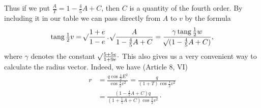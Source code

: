 Thus if we put $\frac{A}{T}=1-\frac{4}{5}A+C$, then $C$ is a quantity of the fourth order. By including it in our table we can pass directly from $A$ to $v$ by the formula
\[
\operatorname{tang}\tfrac{1}{2}v=\mathord{{}^{}\!\surd}\frac{1+e}{1-e}\,\mathord{.}\,\mathord{{}^{}\!\surd}\frac{A}{1-\frac{4}{5}A+C}=\frac{\gamma\operatorname{tang}\tfrac{1}{2}w}{\mathord{{}^{}\!\surd}(1-\frac{4}{5}A+C)},
\]
where $\gamma$ denotes the constant $\mathord{{}^{}\!\surd}\frac{5+5e}{1+9e}\cdot$ This also gives us a very convenient way to calculate the radius vector. Indeed, we have (Article 8, VI)
\[
\begin{aligned}
r&=\frac{q\cos\tfrac{1}{2}E^2}{\cos\tfrac{1}{2}v^2}=\frac{q}{(1+T)\cos\tfrac{1}{2}v^2}\\
&=\frac{(1-\frac{4}{5}A+C)q}{(1+\frac{1}{5}A+C)\cos\tfrac{1}{2}v^2}\cdot
\end{aligned}
\]
